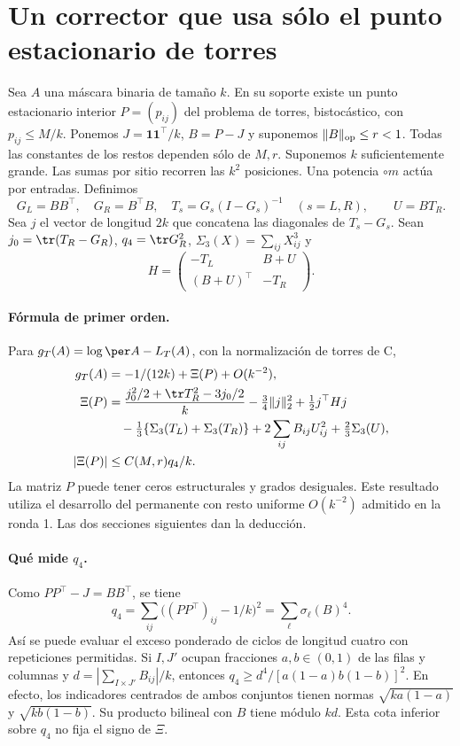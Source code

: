 \section{Un corrector que usa sólo el punto estacionario de torres}
Sea $A$ una máscara binaria de tamaño $k$. En su soporte existe un punto estacionario
interior $P=(p_{ij})$ del problema de torres, bistocástico, con $p_{ij}\le M/k$.
Ponemos $J=\mathbf1\mathbf1^\top/k$, $B=P-J$ y suponemos $\|B\|_{\rm op}\le r<1$.
Todas las constantes de los restos dependen sólo de $M,r$. Suponemos $k$ suficientemente grande.
Las sumas por sitio recorren las $k^2$ posiciones. Una potencia $\circ m$ actúa por entradas.
Definimos
\[
 G_L=BB^\top,\quad G_R=B^\top B,\quad
 T_s=G_s(I-G_s)^{-1}\quad(s=L,R),\qquad U=BT_R .
\]
Sea $j$ el vector de longitud $2k$ que concatena las diagonales de $T_s-G_s$.
Sean $j_0=\tr(T_R-G_R)$, $q_4=\tr G_R^2$,
$\Sigma_3(X)=\sum_{ij}X_{ij}^3$ y
\[
 H=\begin{pmatrix}-T_L&B+U\\ (B+U)^\top&-T_R\end{pmatrix}.
\]
\paragraph{Fórmula de primer orden.}
Para $g_T(A)=\log\per A-L_T(A)$, con la normalización de torres de C,
\begin{align}
 g_T(A)&=-1/(12k)+\Xi(P)+O(k^{-2}),\\
 \Xi(P)&=\frac{j_0^2/2+\tr T_R^2-3j_0/2}{k}
       -\tfrac34\|j\|_2^2+\tfrac12 j^\top Hj \notag\\
 &\quad-\tfrac13\{\Sigma_3(T_L)+\Sigma_3(T_R)\}
       +2\sum_{ij}B_{ij}U_{ij}^2+\tfrac23\Sigma_3(U),\label{eq:xi}\\
 |\Xi(P)|&\le C(M,r)q_4/k .\label{eq:q}
\end{align}
La matriz $P$ puede tener ceros estructurales y grados desiguales.
Este resultado utiliza el desarrollo del permanente con resto uniforme $O(k^{-2})$
admitido en la ronda 1. Las dos secciones siguientes dan la deducción.
\paragraph{Qué mide $q_4$.}
Como $PP^\top-J=BB^\top$, se tiene
\[
 q_4=\sum_{ij}\big((PP^\top)_{ij}-1/k\big)^2
 =\sum_\ell \sigma_\ell(B)^4 .
\]
Así se puede evaluar el exceso ponderado de ciclos de longitud cuatro con repeticiones permitidas.
Si $I,J'$ ocupan fracciones $a,b\in(0,1)$ de las filas y columnas y
$d=|\sum_{I\times J'}B_{ij}|/k$, entonces
$q_4\ge d^4/[a(1-a)b(1-b)]^2$.
En efecto, los indicadores centrados de ambos conjuntos tienen normas $\sqrt{ka(1-a)}$
y $\sqrt{kb(1-b)}$. Su producto bilineal con $B$ tiene módulo $kd$.
Esta cota inferior sobre $q_4$ no fija el signo de $\Xi$.

